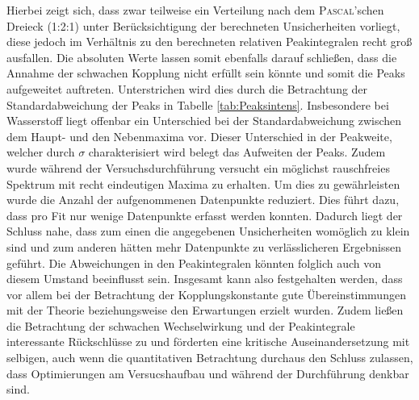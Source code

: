 Hierbei zeigt sich, dass zwar teilweise ein Verteilung nach dem \textsc{Pascal}'schen Dreieck (1:2:1) unter Berücksichtigung der berechneten Unsicherheiten vorliegt, diese jedoch im Verhältnis zu den berechneten relativen Peakintegralen recht groß ausfallen.
Die absoluten Werte lassen somit ebenfalls darauf schließen, dass die Annahme der schwachen Kopplung nicht erfüllt sein könnte und somit die Peaks aufgeweitet auftreten.
Unterstrichen wird dies durch die Betrachtung der Standardabweichung der Peaks in Tabelle \ref{tab:Peaksintens}. 
Insbesondere bei Wasserstoff liegt offenbar ein Unterschied bei der Standardabweichung zwischen dem Haupt- und den Nebenmaxima vor.
Dieser Unterschied in der Peakweite, welcher durch $\sigma$ charakterisiert wird belegt das Aufweiten der Peaks.
Zudem wurde während der Versuchsdurchführung versucht ein möglichst rauschfreies Spektrum mit recht eindeutigen Maxima zu erhalten.
Um dies zu gewährleisten wurde die Anzahl der aufgenommenen Datenpunkte reduziert.
Dies führt dazu, dass pro Fit nur wenige Datenpunkte erfasst werden konnten.
Dadurch liegt der Schluss nahe, dass zum einen die angegebenen Unsicherheiten womöglich zu klein sind und zum anderen hätten mehr Datenpunkte zu verlässlicheren Ergebnissen geführt.
Die Abweichungen in den Peakintegralen könnten folglich auch von diesem Umstand beeinflusst sein.
Insgesamt kann also festgehalten werden, dass vor allem bei der Betrachtung der Kopplungskonstante gute Übereinstimmungen mit der Theorie beziehungsweise den Erwartungen erzielt wurden.
Zudem ließen die Betrachtung der schwachen Wechselwirkung und der Peakintegrale interessante Rückschlüsse zu und förderten eine kritische Auseinandersetzung mit selbigen, auch wenn die quantitativen Betrachtung durchaus den Schluss zulassen, dass Optimierungen am Versucshaufbau und während der Durchführung denkbar sind.




